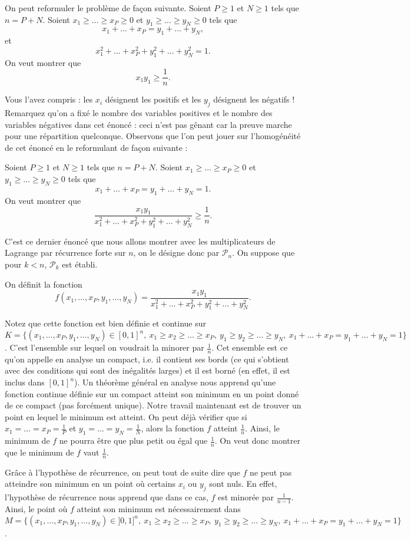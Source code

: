 \begin{sol}
On peut reformuler le problème de façon suivante. Soient $P \ge 1$ et $N \ge 1$ tels que $n=P+N$. Soient $x_1\ge\dots\ge x_P \ge 0$ et $y_1 \ge \dots\ge y_N \ge 0$ tels que
$$
x_1 + \dots + x_P = y_1 + \dots + y_N,
$$
et
$$
x_1^2 + \dots + x_P^2 + y_1^2 + \dots + y_N^2 = 1.
$$
On veut montrer que
$$
x_1 y_1 \ge \frac1{n}.
$$

Vous l'avez compris : les $x_i$ désignent les positifs et les $y_j$ désignent les négatifs ! Remarquez qu'on a fixé le nombre des variables positives et le nombre des variables négatives dans cet énoncé : ceci n'est pas gênant car la preuve marche pour une répartition quelconque. Observons que l'on peut jouer sur l'homogénéité de cet énoncé en le reformulant de façon suivante :

Soient $P \ge 1$ et $N \ge 1$ tels que $n=P+N$. Soient $x_1\ge\dots\ge x_P \ge 0$ et $y_1 \ge \dots\ge y_N \ge 0$ tels que
$$
x_1 + \dots + x_P = y_1 + \dots + y_N = 1.
$$
On veut montrer que
$$
\frac{x_1 y_1}{x_1^2 + \dots + x_P^2 + y_1^2 + \dots + y_N^2} \ge \frac1{n}.
$$

C'est ce dernier énoncé que nous allons montrer avec les multiplicateurs de Lagrange par récurrence forte sur $n$, on le désigne donc par $\mathcal{P}_n$. On suppose que pour $k<n$, $\mathcal{P}_k$ est établi.

On définit la fonction
$$
f(x_1,\dots,x_P,y_1,\dots,y_N)=\frac{x_1 y_1}{x_1^2 + \dots + x_P^2 + y_1^2 + \dots + y_N^2}.
$$

Notez que cette fonction est bien définie et continue sur $K=\{(x_1,\dots,x_P,y_1,\dots,y_N) \in [0,1]^{n},\ x_1 \ge x_2 \ge \dots \ge x_P,\ y_1 \ge y_2 \ge \dots \ge y_N,\ x_1 + \dots + x_P = y_1 + \dots + y_N = 1 \}$. C'est l'ensemble sur lequel on voudrait la minorer par $\frac1{n}$. Cet ensemble est ce qu'on appelle en analyse un compact, i.e. il contient ses bords (ce qui s'obtient avec des conditions qui sont des inégalités larges) et il est borné (en effet, il est inclus dans $[0,1]^{n}$). Un théorème général en analyse nous apprend qu'une fonction continue définie sur un compact atteint son minimum en un point donné de ce compact (pas forcément unique). Notre travail maintenant est de trouver un point en lequel le minimum est atteint. On peut déjà vérifier que si $x_1 = \dots = x_P = \frac1{P}$ et $y_1 = \dots =y_N = \frac1{N}$, alors la fonction $f$ atteint $\frac1{n}$. Ainsi, le minimum de $f$ ne pourra être que plus petit ou égal que $\frac1{n}$. On veut donc montrer que le minimum de $f$ vaut $\frac1{n}$.

Grâce à l'hypothèse de récurrence, on peut tout de suite dire que $f$ ne peut pas atteindre son minimum en un point où certains $x_i$ ou $y_j$ sont nuls. En effet, l'hypothèse de récurrence nous apprend que dans ce cas, $f$ est minorée par $\frac1{n-1}$. Ainsi, le point où $f$ atteint son minimum est nécessairement dans $M=\{(x_1,\dots,x_P,y_1,\dots,y_N) \in ]0,1]^{n},\ x_1 \ge x_2 \ge \dots \ge x_P,\ y_1 \ge y_2 \ge \dots \ge y_N,\ x_1 + \dots + x_P = y_1 + \dots + y_N = 1 \}$.


\end{sol}
